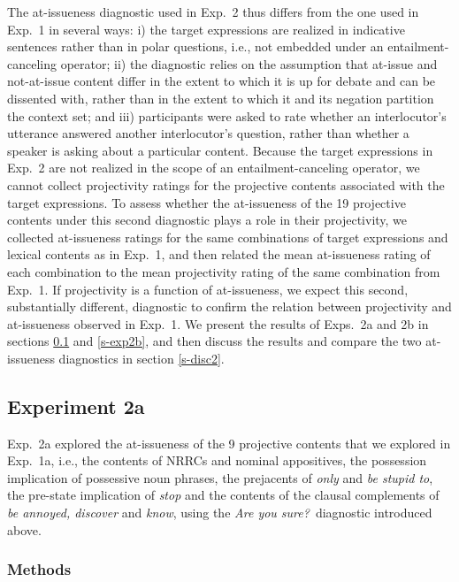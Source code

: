 \documentclass[11pt,fleqn]{article}
\newcommand{\6}{\mbox{$[\hspace*{-.6mm}[$}}
\newcommand{\9}{\mbox{$]\hspace*{-.6mm}]$}}
\begin{document}
The at-issueness diagnostic used in Exp.~2 thus differs from the one used in Exp.~1 in several ways: i) the target expressions are realized in indicative sentences rather than in polar questions, i.e., not embedded under an entailment-canceling operator; ii) the diagnostic relies on the assumption that at-issue and not-at-issue content differ in the extent to which it is up for debate and can be dissented with, rather than in the extent to which it and its negation partition the context set; and iii) participants were asked to rate whether an interlocutor's utterance answered another interlocutor's question, rather than whether a speaker is asking about a particular content. Because the target expressions in Exp.~2 are not realized in the scope of an entailment-canceling operator, we cannot collect projectivity ratings for the projective contents associated with the target expressions. To assess whether the at-issueness of the 19 projective contents under this second diagnostic plays a role in their projectivity, we collected at-issueness ratings for the same combinations of target expressions and lexical contents as in Exp.~1, and then related the mean at-issueness rating of each combination to the mean projectivity rating of the same combination from Exp.~1. If projectivity is a function of at-issueness, we expect this second, substantially different, diagnostic to confirm the relation between projectivity and at-issueness observed in Exp.~1. We present the results of Exps.~2a and 2b in sections \ref{s-exp2a} and \ref{s-exp2b}, and then discuss the results and compare the two at-issueness diagnostics in section \ref{s-disc2}.

\subsection{Experiment 2a}\label{s-exp2a}

Exp.~2a explored the at-issueness of the 9 projective contents that we explored in Exp.~1a, i.e., the contents of NRRCs and nominal appositives, the possession implication of possessive noun phrases, the prejacents of {\em only} and {\em be stupid to}, the pre-state implication of {\em stop} and the contents of the clausal complements of {\em be annoyed, discover} and {\em know}, using the {\em Are you sure?}~diagnostic introduced above.

\subsubsection{Methods}\label{s-methods-2a}
\end{document}
